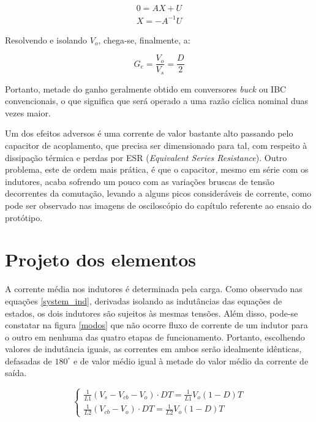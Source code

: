 \documentclass[
        12pt,
        openany, %
        oneside, %
        a4paper,			
        english,			
        brazil
        ]{abntbibufjf}
\begin{document}
\begin{equation}
\begin{array}{lll}
0=AX+U\\
X=-A^{-1}U
\end{array}
\end{equation}

Resolvendo e isolando $V_o$, chega-se, finalmente, a:

\begin{equation}
G_{e} = \frac{V_{o}}{V_{s}} = \frac{D}{2}
\end{equation}


Portanto, metade do ganho geralmente obtido em conversores \textit{buck} ou IBC convencionais, o que significa que será operado a uma razão cíclica nominal duas vezes maior.

Um dos efeitos adversos é uma corrente de valor bastante alto passando pelo capacitor de acoplamento, que precisa ser dimensionado para tal, com respeito à dissipação térmica e perdas por ESR (\textit{Equivalent Series Resistance}). Outro problema, este de ordem mais prática, é que o capacitor, mesmo em série com os indutores, acaba sofrendo um pouco com as variações bruscas de tensão decorrentes da comutação, levando a alguns picos consideráveis de corrente, como pode ser observado nas imagens de osciloscópio do capítulo referente ao ensaio do protótipo.

\section{Projeto dos elementos}


A corrente média nos indutores é determinada pela carga. Como observado nas equações \ref{system_ind}, derivadas isolando as indutâncias das equações de estados, os dois indutores são sujeitos às mesmas tensões. Além disso, pode-se constatar na figura \ref{modos} que não ocorre fluxo de corrente de um indutor para o outro em nenhuma das quatro etapas de funcionamento. Portanto, escolhendo valores de indutância iguais, as correntes em ambos serão idealmente idênticas, defasadas de $180^\circ$ e de valor médio igual à metade do valor médio da corrente de saída.

\begin{equation}
\begin{cases}
\frac{1}{L1} (V_{s} - V_{cb} - V_{o}) \cdot DT = \frac{1}{L1} V_{o}(1-D)T\\
\frac{1}{L2} (V_{cb} - V_{o}) \cdot DT = \frac{1}{L2} V_{o}(1-D)T
\end{cases}
\label{system_ind}
\end{equation}
\end{document}
